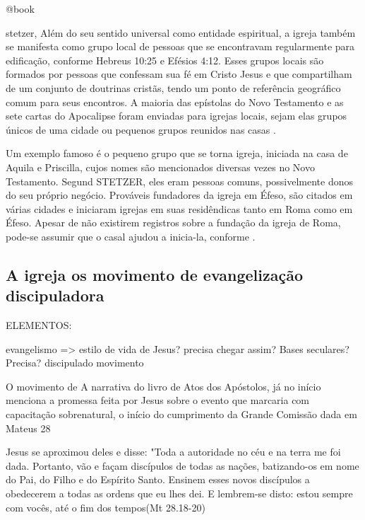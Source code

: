 \documentclass[
	12pt,				%
	openright,			%
	twoside,			%
	a4paper,			%
	english,			%
	french,				%
	spanish,			%
	brazil				%
	]{abntex2}
\begin{document}
@book{stetzer,
Além do seu sentido universal como entidade espiritual, a igreja também se manifesta como grupo local de pessoas que se encontravam regularmente para edificação, conforme Hebreus 10:25 e Efésios 4:12. Esses grupos locais são formados por pessoas que confessam sua fé em Cristo Jesus e que compartilham de um conjunto de doutrinas cristãs, tendo um ponto de referência geográfico comum para seus encontros. A maioria das epístolas do Novo Testamento e as sete cartas do Apocalipse foram enviadas para igrejas locais, sejam elas grupos únicos de uma cidade ou pequenos grupos reunidos nas casas \cite[320]{zac}. 

Um exemplo famoso é o pequeno grupo que se torna igreja, iniciada na casa de Aquila e Priscilla, cujos nomes são mencionados diversas vezes no Novo Testamento. Segund STETZER, eles eram pessoas comuns, possivelmente donos do seu próprio negócio. Prováveis fundadores da igreja em Éfeso, são citados em várias cidades e iniciaram igrejas em suas residêndicas tanto em Roma como em Éfeso. Apesar de não existirem registros sobre a fundação da igreja de Roma, pode-se assumir que o casal ajudou a inicia-la, conforme \cite[54]{stetzer}.

\subsection{A igreja os movimento de evangelização discipuladora}



ELEMENTOS:

evangelismo => estilo de vida de Jesus? precisa chegar assim? Bases seculares? Precisa?
discipulado
movimento

O movimento de A narrativa do livro de Atos dos Apóstolos, já no início menciona a promessa feita por Jesus sobre o evento que marcaria com capacitação sobrenatural, o início do cumprimento da Grande Comissão dada em Mateus 28

\begin{citacao}
Jesus se aproximou deles e disse: "Toda a autoridade no céu e na terra me foi dada. Portanto, vão e façam discípulos de todas as nações, batizando-os em nome do Pai, do Filho e do Espírito Santo. Ensinem esses novos discípulos a obedecerem a todas as ordens que eu lhes dei. E lembrem-se disto: estou sempre com vocês, até o fim dos tempos(Mt 28.18-20)
\end{citacao}


}
\end{document}
